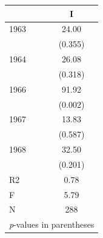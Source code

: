 \begin{tabular}{l*{1}{c}}
\hline\hline
            &\multicolumn{1}{c}{I}\\
\hline
1963        &       24.00\\
            &     (0.355)\\
[1em]
1964        &       26.08\\
            &     (0.318)\\
[1em]
1966        &       91.92\\
            &     (0.002)\\
[1em]
1967        &       13.83\\
            &     (0.587)\\
[1em]
1968        &       32.50\\
            &     (0.201)\\
\hline
R2          &        0.78\\
F           &        5.79\\
N           &         288\\
\hline\hline
\multicolumn{2}{l}{\footnotesize \textit{p}-values in parentheses}\\
\end{tabular}
